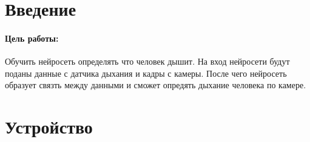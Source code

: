 


\newpage 

\tableofcontents
\newpage
\section{Введение}
\paragraph{Цель работы:} Обучить нейросеть определять что человек дышит. На вход нейросети будут поданы данные с датчика дыхания и кадры с камеры. После чего нейросеть образует связть между данными и сможет опредять дыхание человека по камере.
\section{Устройство}
